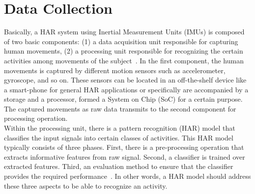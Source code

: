 \documentclass[journal,article,submit,moreauthors,pdftex]{Definitions/mdpi}
\begin{document}
%
%
%
%

\section{Data Collection}


Basically, a HAR system using Inertial Measurement Units (IMUs) is composed of two basic components: (1) a data acquisition unit responsible for capturing human movements, (2) a processing unit responsible for recognizing the certain activities among movements of the subject~\cite{rosati2018comparison}. In the first component, the human movements is captured by different motion sensors such as accelerometer, gyroscope, and so on. These sensors can be located in an off-the-shelf device like a smart-phone for general HAR applications or specifically are accompanied by a storage and a processor, formed a System on Chip (SoC) for a certain purpose. The captured movements as raw data transmits to the second component for processing operation.\\
Within the processing unit, there is a pattern recognition (HAR) model that classifies the input signals into certain classes of activities. This HAR model typically consists of three phases. First, there is a pre-processing operation that extracts informative features from raw signal. Second, a classifier is trained over extracted features. Third, an evaluation method to ensure that the classifier provides the required performance~\cite{kolodziej2019registration}. In other words, a HAR model should address these three aspects to be able to recognize an activity.
\end{document}
